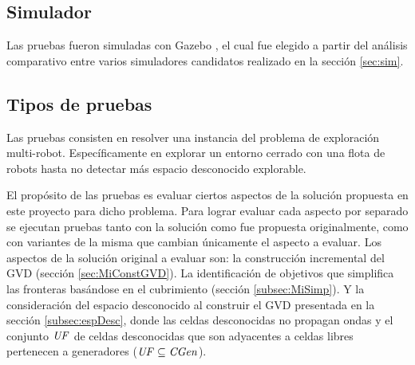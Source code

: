 
\subsection{Simulador}
Las pruebas fueron simuladas con Gazebo \cite{gazebo}, el cual fue elegido a
partir del análisis comparativo entre varios simuladores candidatos realizado
en la sección \ref{sec:sim}. 

\subsection{Tipos de pruebas}
Las pruebas consisten en resolver una instancia del problema de exploración
multi-robot. Específicamente en explorar un entorno cerrado con una flota de
robots hasta no detectar más espacio desconocido explorable. 

El propósito de las pruebas es evaluar ciertos aspectos de la solución
propuesta en este proyecto para dicho problema. Para lograr evaluar cada
aspecto por separado se ejecutan pruebas tanto con la solución como fue
propuesta originalmente, como con variantes de la misma que cambian únicamente
el aspecto a evaluar. Los aspectos de la solución original a evaluar son: la construcción incremental
del GVD (sección \ref{sec:MiConstGVD}). La identificación de objetivos que
simplifica las fronteras basándose en el cubrimiento (sección
\ref{subsec:MiSimp}). Y la consideración del espacio desconocido al construir
el GVD presentada en la sección \ref{subsec:espDesc}, donde las celdas
desconocidas no propagan ondas y el conjunto $\mathit{UF}$ de celdas desconocidas
que son adyacentes a celdas libres pertenecen a generadores ($\mathit{UF}
\subseteq \mathit{CGen}$).



